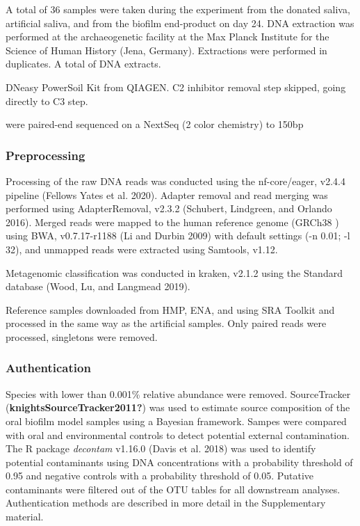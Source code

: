 \documentclass[
]{article}
\begin{document}
A total of 36 samples were taken during the experiment from the donated
saliva, artificial saliva, and from the biofilm end-product on day 24.
DNA extraction was performed at the archaeogenetic facility at the Max
Planck Institute for the Science of Human History (Jena, Germany).
Extractions were performed in duplicates. A total of DNA extracts.

DNeasy PowerSoil Kit from QIAGEN. C2 inhibitor removal step skipped,
going directly to C3 step.

were paired-end sequenced on a NextSeq (2 color chemistry) to 150bp

\hypertarget{preprocessing}{%
\subsubsection{Preprocessing}\label{preprocessing}}

Processing of the raw DNA reads was conducted using the nf-core/eager,
v2.4.4 pipeline (Fellows Yates et al. 2020). Adapter removal and read
merging was performed using AdapterRemoval, v2.3.2 (Schubert, Lindgreen,
and Orlando 2016). Merged reads were mapped to the human reference
genome (GRCh38 ) using BWA, v0.7.17-r1188 (Li and Durbin 2009) with
default settings (-n 0.01; -l 32), and unmapped reads were extracted
using Samtools, v1.12.

Metagenomic classification was conducted in kraken, v2.1.2 using the
Standard database (Wood, Lu, and Langmead 2019).

Reference samples downloaded from HMP, ENA, and using SRA Toolkit and
processed in the same way as the artificial samples. Only paired reads
were processed, singletons were removed.

\hypertarget{authentication}{%
\subsubsection{Authentication}\label{authentication}}

Species with lower than 0.001\% relative abundance were removed.
SourceTracker (\textbf{knightsSourceTracker2011?}) was used to estimate
source composition of the oral biofilm model samples using a Bayesian
framework. Sampes were compared with oral and environmental controls to
detect potential external contamination. The R package \emph{decontam}
v1.16.0 (Davis et al. 2018) was used to identify potential contaminants
using DNA concentrations with a probability threshold of 0.95 and
negative controls with a probability threshold of 0.05. Putative
contaminants were filtered out of the OTU tables for all downstream
analyses. Authentication methods are described in more detail in the
Supplementary material.
\end{document}
